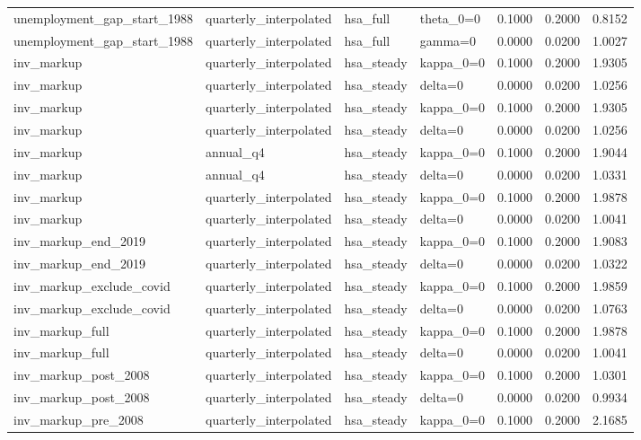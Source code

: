 \begin{tabular}{llllrrr}
unemployment\_gap\_start\_1988 & quarterly\_interpolated & hsa\_full & theta\_0=0 & 0.1000 & 0.2000 & 0.8152 \\
unemployment\_gap\_start\_1988 & quarterly\_interpolated & hsa\_full & gamma=0 & 0.0000 & 0.0200 & 1.0027 \\
inv\_markup & quarterly\_interpolated & hsa\_steady & kappa\_0=0 & 0.1000 & 0.2000 & 1.9305 \\
inv\_markup & quarterly\_interpolated & hsa\_steady & delta=0 & 0.0000 & 0.0200 & 1.0256 \\
inv\_markup & quarterly\_interpolated & hsa\_steady & kappa\_0=0 & 0.1000 & 0.2000 & 1.9305 \\
inv\_markup & quarterly\_interpolated & hsa\_steady & delta=0 & 0.0000 & 0.0200 & 1.0256 \\
inv\_markup & annual\_q4 & hsa\_steady & kappa\_0=0 & 0.1000 & 0.2000 & 1.9044 \\
inv\_markup & annual\_q4 & hsa\_steady & delta=0 & 0.0000 & 0.0200 & 1.0331 \\
inv\_markup & quarterly\_interpolated & hsa\_steady & kappa\_0=0 & 0.1000 & 0.2000 & 1.9878 \\
inv\_markup & quarterly\_interpolated & hsa\_steady & delta=0 & 0.0000 & 0.0200 & 1.0041 \\
inv\_markup\_end\_2019 & quarterly\_interpolated & hsa\_steady & kappa\_0=0 & 0.1000 & 0.2000 & 1.9083 \\
inv\_markup\_end\_2019 & quarterly\_interpolated & hsa\_steady & delta=0 & 0.0000 & 0.0200 & 1.0322 \\
inv\_markup\_exclude\_covid & quarterly\_interpolated & hsa\_steady & kappa\_0=0 & 0.1000 & 0.2000 & 1.9859 \\
inv\_markup\_exclude\_covid & quarterly\_interpolated & hsa\_steady & delta=0 & 0.0000 & 0.0200 & 1.0763 \\
inv\_markup\_full & quarterly\_interpolated & hsa\_steady & kappa\_0=0 & 0.1000 & 0.2000 & 1.9878 \\
inv\_markup\_full & quarterly\_interpolated & hsa\_steady & delta=0 & 0.0000 & 0.0200 & 1.0041 \\
inv\_markup\_post\_2008 & quarterly\_interpolated & hsa\_steady & kappa\_0=0 & 0.1000 & 0.2000 & 1.0301 \\
inv\_markup\_post\_2008 & quarterly\_interpolated & hsa\_steady & delta=0 & 0.0000 & 0.0200 & 0.9934 \\
inv\_markup\_pre\_2008 & quarterly\_interpolated & hsa\_steady & kappa\_0=0 & 0.1000 & 0.2000 & 2.1685 \\

\end{tabular}
